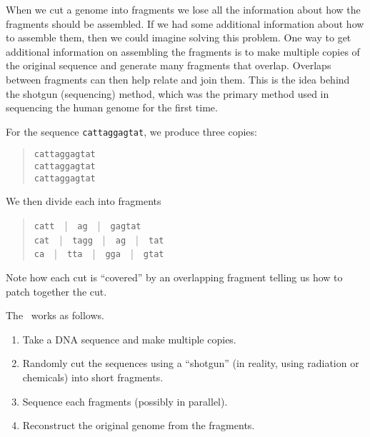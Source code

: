 \begin{gram}
When we cut a genome into fragments we lose all the information
about how the fragments should be assembled.
%
If we had some additional information about how to assemble them, then
we could imagine solving this problem.
%
One way to get additional information on assembling the fragments is
to make multiple copies of the original sequence and generate many
fragments that overlap.
%
Overlaps between fragments can then help relate and join them.
%
This is the idea behind the shotgun (sequencing) method, which was the
primary method used in sequencing the human genome for the first time.
\end{gram}

\begin{example}
For the sequence
%
\texttt{cattaggagtat}, 
%
we produce three copies:

\begin{quote}
\texttt{cattaggagtat}\\
\texttt{cattaggagtat}\\
\texttt{cattaggagtat}
\end{quote}

We then divide each into fragments
%
\begin{quote}
\texttt{catt}~~|~~\texttt{ag}~~|~~\texttt{gagtat}
\\
\texttt{cat}~~|~~\texttt{tagg}~~|~~\texttt{ag}~~|~~\texttt{tat}
\\
\texttt{ca}~~|~~\texttt{tta}~~|~~\texttt{gga}~~|~~\texttt{gtat}
\end{quote}
 
Note how each cut is ``covered'' by an overlapping fragment telling us
how to patch together the cut.

\end{example}

\begin{definition}

The~ works as follows.
\begin{enumerate}
\item Take a DNA sequence and make multiple copies.  

\item Randomly cut the sequences using a ``shotgun'' (in reality,
  using radiation or chemicals) into short fragments.

\item Sequence each fragments (possibly in parallel).

\item Reconstruct the original genome from the fragments.  
\end{enumerate}
\end{definition}

